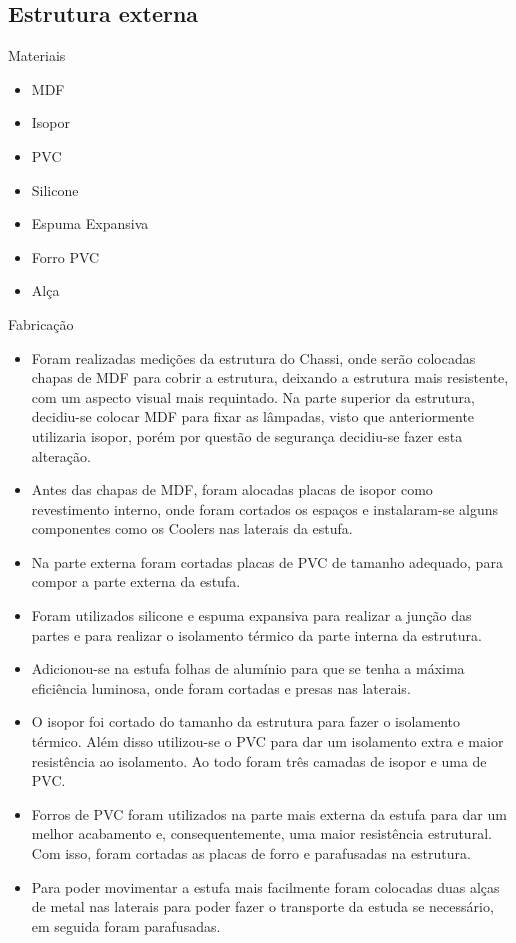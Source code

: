 \subsection{Estrutura externa}
Materiais
\begin{itemize}
	\item MDF
	\item Isopor
	\item PVC
	\item Silicone
	\item Espuma Expansiva
	\item Forro PVC
	\item Alça
\end{itemize}
Fabricação
\begin{itemize}
	\item Foram realizadas medições da estrutura do Chassi, onde serão colocadas chapas de MDF para cobrir a estrutura, deixando a estrutura mais resistente, com um aspecto visual mais requintado. Na parte superior da estrutura, decidiu-se colocar MDF para fixar as lâmpadas, visto que anteriormente utilizaria isopor, porém por questão de segurança decidiu-se fazer esta alteração.
	\item Antes das chapas de MDF, foram alocadas placas de isopor como revestimento interno, onde foram cortados os espaços e instalaram-se alguns componentes como os Coolers nas laterais da estufa.
	\item Na parte externa foram cortadas placas de PVC de tamanho adequado, para compor a parte externa da estufa.
	\item Foram utilizados silicone e espuma expansiva para realizar a junção das partes e para realizar o isolamento térmico da parte interna da estrutura.
	\item Adicionou-se na estufa folhas de alumínio para que se tenha a máxima eficiência luminosa, onde foram cortadas e presas nas laterais.
	\item O isopor foi cortado do tamanho da estrutura para fazer o isolamento térmico. Além disso utilizou-se o PVC para dar um isolamento extra e maior resistência ao isolamento. Ao todo foram três camadas de isopor e uma de PVC.
	\item Forros de PVC foram utilizados na parte mais externa da estufa para dar um melhor acabamento e, consequentemente, uma maior resistência estrutural. Com isso, foram cortadas as placas de forro e parafusadas na estrutura.
	\item Para poder movimentar a estufa mais facilmente foram colocadas duas alças de metal nas laterais para poder fazer o transporte da estuda se necessário, em seguida foram parafusadas.
	
\end{itemize}

